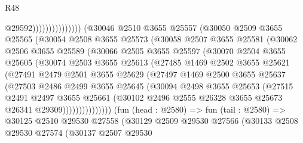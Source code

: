 \begin{lexlean}{R48}
\begin{coremodule}
                                      @29592)))))))))))))))
        (@30046
          @2510
          @3655
          @25557
          (@30050
            @2509
            @3655
            @25565
            (@30054
              @2508
              @3655
              @25573
              (@30058
                @2507
                @3655
                @25581
                (@30062
                  @2506
                  @3655
                  @25589
                  (@30066
                    @2505
                    @3655
                    @25597
                    (@30070
                      @2504
                      @3655
                      @25605
                      (@30074
                        @2503
                        @3655
                        @25613
                        (@27485
                          @1469
                          @2502
                          @3655
                          @25621
                          (@27491
                            @2479
                            @2501
                            @3655
                            @25629
                            (@27497
                              @1469
                              @2500
                              @3655
                              @25637
                              (@27503
                                @2486
                                @2499
                                @3655
                                @25645
                                (@30094
                                  @2498
                                  @3655
                                  @25653
                                  (@27515
                                    @2491
                                    @2497
                                    @3655
                                    @25661
                                    (@30102
                                      @2496
                                      @2555
                                      @26328
                                      @3655
                                      @25673
                                      @26341
                                      @29309)))))))))))))))
        (fun (head : @2580) =>
        fun (tail : @2580) =>
        @30125
          @2510
          @29530
          @27558
          (@30129
            @2509
            @29530
            @27566
            (@30133
              @2508
              @29530
              @27574
              (@30137
                @2507
                @29530

\end{coremodule}
\end{lexlean}
